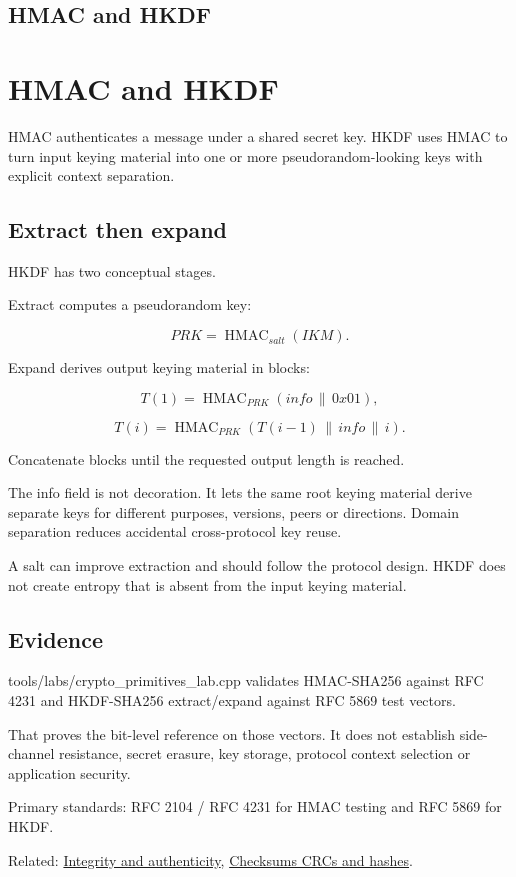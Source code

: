 \hypertarget{appendix-50af792c9da7}{}
\section*{HMAC and HKDF}
\chapter{HMAC and HKDF}\label{appendix-50af792c9da7-hmac-and-hkdf}

HMAC authenticates a message under a shared secret key. HKDF uses HMAC to turn input keying material into one or more pseudorandom-looking keys with explicit context separation.

\section{Extract then expand}\label{appendix-50af792c9da7-extract-then-expand}

HKDF has two conceptual stages.

Extract computes a pseudorandom key:

\[
PRK=\operatorname{HMAC}_{salt}(IKM).
\]

Expand derives output keying material in blocks:

\[
T(1)=\operatorname{HMAC}_{PRK}(info\,\|\,0x01),
\]

\[
T(i)=\operatorname{HMAC}_{PRK}(T(i-1)\,\|\,info\,\|\,i).
\]

Concatenate blocks until the requested output length is reached.

The info field is not decoration. It lets the same root keying material derive separate keys for different purposes, versions, peers or directions. Domain separation reduces accidental cross-protocol key reuse.

A salt can improve extraction and should follow the protocol design. HKDF does not create entropy that is absent from the input keying material.

\section{Evidence}\label{appendix-50af792c9da7-evidence}

tools/labs/crypto\_primitives\_lab.cpp validates HMAC-SHA256 against RFC 4231 and HKDF-SHA256 extract/expand against RFC 5869 test vectors.

That proves the bit-level reference on those vectors. It does not establish side-channel resistance, secret erasure, key storage, protocol context selection or application security.

Primary standards: RFC 2104 / RFC 4231 for HMAC testing and RFC 5869 for HKDF.

Related: \hyperref[appendix-cbe594d1ab0a]{Integrity and authenticity}, \hyperref[appendix-ed338677de0a]{Checksums CRCs and hashes}.
